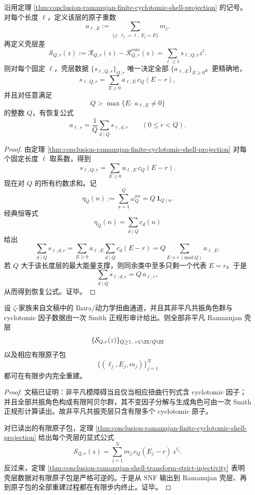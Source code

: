\begin{theorem}\label{thm:conclusion-ramanujan-shell-transform-strict-injectivity}
沿用定理 \ref{thm:conclusion-ramanujan-finite-cyclotomic-shell-projection} 的记号。对每个长度 \(\ell\)，定义该层的原子重数
\[
a_{\ell,E}:=\sum_{\{j:\ \ell_j=\ell,\ E_j=E\}}m_j.
\]
再定义壳层差
\[
\mathcal S_{Q,r}(z):=\mathcal R_{Q,r}(z)-\mathcal R_{Q,r}^{\mathrm{core}}(z)
=\sum_{\ell\ge 1}s_{\ell,Q,r}z^\ell.
\]
则对每个固定 \(\ell\)，壳层数据 \(\{s_{\ell,Q,r}\}_{Q,r}\) 唯一决定全部 \(\{a_{\ell,E}\}_{E\ge 0}\)。更精确地，
\[
s_{\ell,Q,r}=\sum_{E\ge 0}a_{\ell,E}\,c_Q(E-r),
\]
并且对任意满足
\[
Q>\max\{E:\ a_{\ell,E}\neq 0\}
\]
的整数 \(Q\)，有恢复公式
\[
a_{\ell,r}
=
\frac1Q\sum_{d\mid Q}s_{\ell,d,r}
\qquad (0\le r<Q).
\]
\end{theorem}
\begin{proof}
由定理 \ref{thm:conclusion-ramanujan-finite-cyclotomic-shell-projection} 对每个固定长度 \(\ell\) 取系数，得到
\[
s_{\ell,Q,r}=\sum_{E\ge 0}a_{\ell,E}\,c_Q(E-r).
\]
现在对 \(Q\) 的所有约数求和。记
\[
\eta_Q(n):=\sum_{a=1}^{Q}\omega_Q^{an}=Q\,\mathbf 1_{Q\mid n}.
\]
经典恒等式
\[
\eta_Q(n)=\sum_{d\mid Q}c_d(n)
\]
给出
\[
\sum_{d\mid Q}s_{\ell,d,r}
=
\sum_{E\ge 0}a_{\ell,E}\sum_{d\mid Q}c_d(E-r)
=
Q\sum_{E\equiv r\ (\mathrm{mod}\ Q)}a_{\ell,E}.
\]
若 \(Q\) 大于该长度层的最大能量支撑，则同余类中至多只剩一个代表 \(E=r\)。于是
\[
\sum_{d\mid Q}s_{\ell,d,r}=Q\,a_{\ell,r},
\]
从而得到恢复公式。证毕。
\end{proof}

\begin{theorem}\label{thm:conclusion-resonance-shell-snf-finite-reconstruction}
设 \(\zeta\)-家族来自文稿中的 Ihara/动力学扭曲通道，并且其非平凡共振角色群与 cyclotomic 因子数据由一次 Smith 正规形审计给出。则全部非平凡 Ramanujan 壳层
\[
\{\mathcal S_{Q,r}(z)\}_{Q\ge 1,\ r\in \ZZ/Q\ZZ}
\]
以及相应有限原子包
\[
\{(\ell_j,E_j,m_j)\}_{j=1}^{N}
\]
都可在有限步内完全重建。
\end{theorem}
\begin{proof}
文稿已证明：非平凡模障碍当且仅当相应扭曲行列式含 cyclotomic 因子；并且全部共振角色构成有限阿贝尔群，其不变因子分解与生成角色可由一次 Smith 正规形计算读出。故非平凡共振壳层只含有限多个 cyclotomic 原子。

对已读出的有限原子包，定理 \ref{thm:conclusion-ramanujan-finite-cyclotomic-shell-projection} 给出每个壳层的显式公式
\[
\mathcal S_{Q,r}(z)=\sum_{j=1}^{N}m_j\,c_Q(E_j-r)\,z^{\ell_j}.
\]
反过来，定理 \ref{thm:conclusion-ramanujan-shell-transform-strict-injectivity} 表明壳层数据对有限原子包是严格可逆的。于是从 SNF 输出到 Ramanujan 壳层、再到原子包的全部重建过程都在有限步内终止。证毕。
\end{proof}

